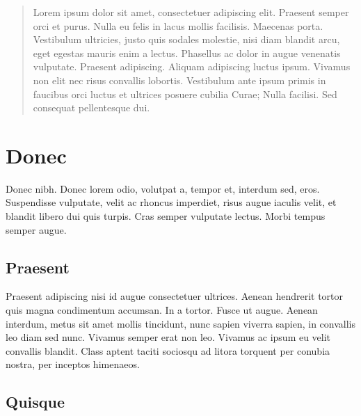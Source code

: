 \documentclass[a4paper]{article}
\begin{document}
\begin{abstract}
Lorem ipsum dolor sit amet, consectetuer adipiscing elit. Praesent semper orci
et purus. Nulla eu felis in lacus mollis facilisis. Maecenas porta. Vestibulum
ultricies, justo quis sodales molestie, nisi diam blandit arcu, eget egestas
mauris enim a lectus. Phasellus ac dolor in augue venenatis vulputate. Praesent
adipiscing. Aliquam adipiscing luctus ipsum. Vivamus non elit nec risus
convallis lobortis. Vestibulum ante ipsum primis in faucibus orci luctus et
ultrices posuere cubilia Curae; Nulla facilisi. Sed consequat pellentesque dui.
\end{abstract}

\tableofcontents              %

\usepackage{subcaption}
\section{Donec}               %

Donec nibh. Donec lorem odio, volutpat a, tempor et, interdum sed, eros.
Suspendisse vulputate, velit ac rhoncus imperdiet, risus augue iaculis velit, et
blandit libero dui quis turpis. Cras semper vulputate lectus. Morbi tempus
semper augue.

\subsection{Praesent}         %

Praesent adipiscing nisi id augue consectetuer ultrices. Aenean hendrerit tortor
quis magna condimentum accumsan. In a tortor. Fusce ut augue. Aenean interdum,
metus sit amet mollis tincidunt, nunc sapien viverra sapien, in convallis leo
diam sed nunc. Vivamus semper erat non leo. Vivamus ac ipsum eu velit convallis
blandit. Class aptent taciti sociosqu ad litora torquent per conubia nostra, per
inceptos himenaeos.


\subsection{Quisque}
\end{document}
